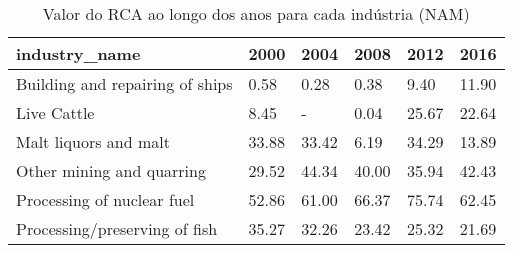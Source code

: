 \begin{table}
\centering
\caption{Valor do RCA ao longo dos anos para cada indústria (NAM)}
\begin{tabular}{p{6cm}p{1.5cm}p{1.5cm}p{1.5cm}p{1.5cm}p{1.5cm}}
\toprule
                  industry\_name &  2000 &  2004 &  2008 &  2012 &  2016 \\
\midrule
Building and repairing of ships &  0.58 &  0.28 &  0.38 &  9.40 & 11.90 \\
                    Live Cattle &  8.45 &     - &  0.04 & 25.67 & 22.64 \\
          Malt liquors and malt & 33.88 & 33.42 &  6.19 & 34.29 & 13.89 \\
      Other mining and quarring & 29.52 & 44.34 & 40.00 & 35.94 & 42.43 \\
     Processing of nuclear fuel & 52.86 & 61.00 & 66.37 & 75.74 & 62.45 \\
  Processing/preserving of fish & 35.27 & 32.26 & 23.42 & 25.32 & 21.69 \\
\bottomrule
\end{tabular}
\end{table}
